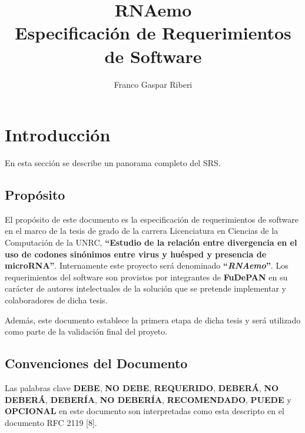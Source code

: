 \documentclass[12pt,a4paper,spanish]{article}
\title{\textbf{RNAemo}\\ \vspace{0.45cm} Especificación de Requerimientos de Software}
\author{Franco Gaspar Riberi}
\newcommand{\rnaemo}{\textbf{\emph{RNAemo}}}
\begin{document}
\maketitle\pagebreak{}\tableofcontents{}\pagebreak{}

\newpage

\section{Introducción}
En esta sección se describe un panorama completo del SRS.

\subsection{Propósito}
\par El propósito de este documento es la especificación de requerimientos
de software en el marco de la tesis de grado de la carrera Licenciatura en
Ciencias de la Computación de la UNRC, \textbf{``Estudio de la relación entre divergencia en el uso de codones 
sinónimos entre virus y huésped y presencia de microRNA''}. Internamente este proyecto será denominado \textbf{``}\rnaemo\textbf{''}.
Los requerimientos del software son provistos por integrantes de \textbf{FuDePAN} en su carácter de autores
intelectuales de la solución que se pretende implementar y colaboradores
de dicha tesis.
\par Además, este documento establece la primera etapa de dicha tesis y será utilizado
como parte de la validación final del proyeto.

\subsection{Convenciones del Documento}
Las palabras clave \textbf{DEBE}, \textbf{NO DEBE}, \textbf{REQUERIDO}, \textbf{DEBERÁ}, \textbf{NO DEBERÁ},
 \textbf{DEBERÍA}, \textbf{NO DEBERÍA}, \textbf{RECOMENDADO}, \textbf{PUEDE} y \textbf{OPCIONAL}
en este documento son interpretadas como esta descripto en el documento RFC
2119 [8]. 
\end{document}
